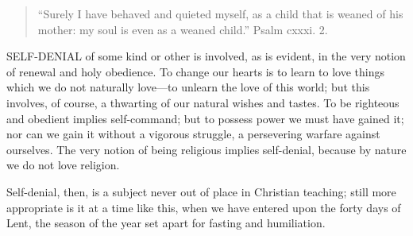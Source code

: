 
\begin{quote}

``Surely I have behaved and quieted myself, as a child that
is weaned of his mother: my soul is even as a weaned child.''
Psalm cxxxi. 2.

\end{quote}

SELF-DENIAL of some kind or other is involved, as is evident, in
the very notion of renewal and holy obedience. To change our hearts is
to learn to love things which we do not naturally love—to unlearn
the love of this world; but this involves, of course, a thwarting of
our natural wishes and tastes. To be righteous and obedient implies
self-command; but to possess power we must have gained it; nor can we
gain it without a vigorous struggle, a persevering warfare against
ourselves. The very notion of being religious implies self-denial,
because by nature we do not love religion.

Self-denial, then, is a subject never out of place in Christian
teaching; still more appropriate is it at a time like this, when we
have entered upon the forty days of Lent, the season of the year set
apart for fasting and humiliation.

